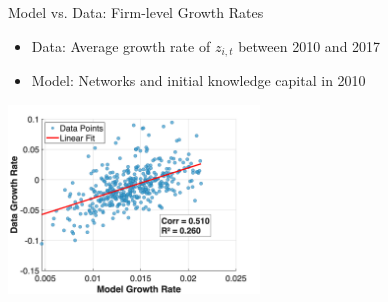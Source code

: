 \documentclass[
  10pt,
  aspectratio=169,   %
]{beamer}
\theoremstyle{plain}
\begin{document}
\begin{frame}{Model vs. Data: Firm-level Growth Rates}
  \begin{itemize}
    \item Data: Average growth rate of $z_{i,t}$ between 2010 and 2017
          \medskip{}
    \item Model: Networks and initial knowledge capital in 2010
  \end{itemize}
  \medskip{}
  \begin{center}
    \includegraphics[width=0.5\textwidth]{figures/NO_growth_rate_comparison.png}
  \end{center}
\end{frame}
\end{document}
